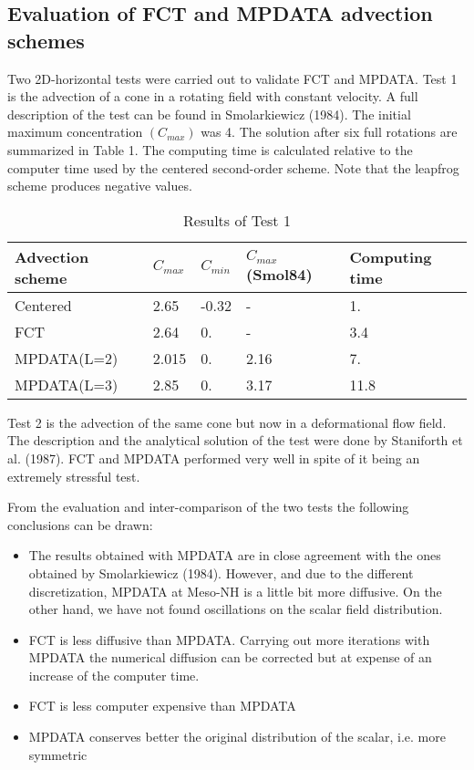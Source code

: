 \subsection{Evaluation of FCT and MPDATA advection schemes}

Two 2D-horizontal tests were carried out to validate FCT and MPDATA. Test 1 is the
advection of a cone in a rotating field with constant velocity. A full description
of the test can be found in Smolarkiewicz (1984). The initial maximum
concentration $(C_{max})$ was 4. The solution after six full rotations are summarized in Table 1.
The computing time is calculated relative to the computer time used by the centered
second-order
scheme. Note that the leapfrog scheme produces negative values.


\begin{table}[htpb]
  \centering
  \caption{Results of Test 1}
  \begin{tabular}{p{3cm}p{3cm}p{3cm}p{3cm}p{3cm}}
    \hline
    Advection scheme  &  $C_{max}$  &  $C_{min}$  & $C_{max}$(Smol84)  &  Computing time  \\
    \hline
    \hline
    Centered      &   2.65  &  -0.32 &  -    & 1.      \\
    FCT          &   2.64  &   0.   &  -    & 3.4     \\
    MPDATA(L=2)  &   2.015 &   0.   & 2.16  & 7.       \\
    MPDATA(L=3)  &   2.85  &   0.   & 3.17  &11.8      \\
    \hline
  \end{tabular}
\end{table}

Test 2 is the advection of the same cone but now in a deformational flow field. The
description and the analytical solution of the test were done by Staniforth et al. (1987).
FCT and MPDATA performed very well in spite of it being an extremely stressful test.

From the evaluation and inter-comparison of the two tests
the following conclusions can be drawn:

\begin{itemize}

\item{The results obtained with MPDATA are in close agreement with the ones obtained
by Smolarkiewicz (1984). However, and due to the different discretization, MPDATA
at Meso-NH is a little bit more diffusive. On the other hand, we have not found oscillations
on the scalar field distribution.}

\item{FCT is less diffusive than MPDATA. Carrying out more iterations with MPDATA the
numerical diffusion can be corrected but at expense of an increase of the computer time.}

\item{FCT is less computer expensive than MPDATA}

\item{MPDATA conserves better the original distribution of the scalar, i.e. more symmetric}

\end{itemize}

